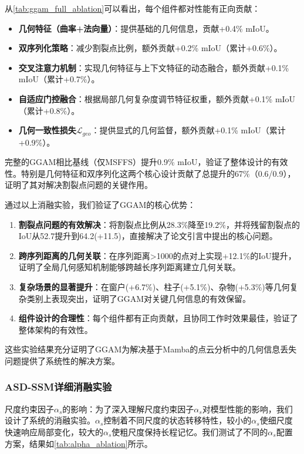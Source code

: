 \documentclass[preprint,12pt]{elsarticle}
\begin{document}
从\cref{tab:ggam_full_ablation}可以看出，每个组件都对性能有正向贡献：
\begin{itemize}
	\item \textbf{几何特征（曲率+法向量）}：提供基础的几何信息，贡献+0.4\% mIoU。
	\item \textbf{双序列化策略}：减少割裂点比例，额外贡献+0.2\% mIoU（累计+0.6\%）。
	\item \textbf{交叉注意力机制}：实现几何特征与上下文特征的动态融合，额外贡献+0.1\% mIoU（累计+0.7\%）。
	\item \textbf{自适应门控融合}：根据局部几何复杂度调节特征权重，额外贡献+0.1\% mIoU（累计+0.8\%）。
	\item \textbf{几何一致性损失$\mathcal{L}_{geo}$}：提供显式的几何监督，额外贡献+0.1\% mIoU（累计+0.9\%）。
\end{itemize}

完整的GGAM相比基线（仅MSFFS）提升0.9\% mIoU，验证了整体设计的有效性。特别是几何特征和双序列化这两个核心设计贡献了总提升的67\%（0.6/0.9），证明了其对解决割裂点问题的关键作用。

通过以上消融实验，我们验证了GGAM的核心优势：
\begin{enumerate}
	\item \textbf{割裂点问题的有效解决}：将割裂点比例从28.3\%降至19.2\%，并将残留割裂点的IoU从52.7提升到64.2(+11.5)，直接解决了论文引言中提出的核心问题。
	
	\item \textbf{跨序列距离的几何关联}：在序列距离>1000的点对上实现+12.1\%的IoU提升，证明了全局几何感知机制能够跨越长序列距离建立几何关联。
	
	\item \textbf{复杂场景的显著提升}：在窗户(+6.7\%)、柱子(+5.1\%)、杂物(+5.3\%)等几何复杂类别上表现突出，证明了GGAM对关键几何信息的有效保留。
	
	\item \textbf{组件设计的合理性}：每个组件都有正向贡献，且协同工作时效果最佳，验证了整体架构的有效性。
\end{enumerate}

这些实验结果充分证明了GGAM为解决基于Mamba的点云分析中的几何信息丢失问题提供了系统性的解决方案。

\subsubsection{ASD-SSM详细消融实验}

尺度约束因子$\alpha_s$的影响：为了深入理解尺度约束因子$\alpha_s$对模型性能的影响，我们设计了系统的消融实验。$\alpha_s$控制着不同尺度的状态转移特性，较小的$\alpha_s$使细尺度快速响应局部变化，较大的$\alpha_s$使粗尺度保持长程记忆。我们测试了不同的$\alpha_s$配置方案，结果如\cref{tab:alpha_ablation}所示。
\end{document}
